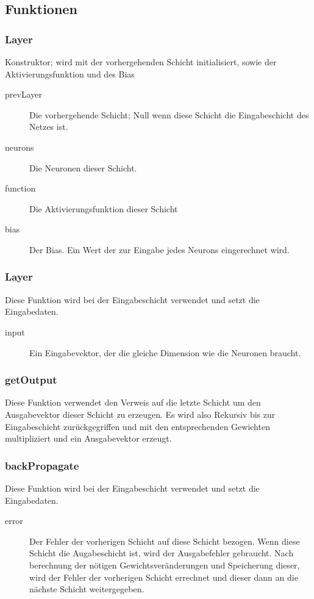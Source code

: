 \documentclass[a4paper,10pt]{scrartcl}
\begin{document}
\subsection{Funktionen}
\subsubsection{Layer}
Konstruktor; wird mit der vorhergehenden Schicht initialisiert, sowie der Aktivierungsfunktion und des Bias
\begin{description}
\item[prevLayer] Die vorhergehende Schicht; Null wenn diese Schicht die Eingabeschicht des Netzes ist.
\item[neurons] Die Neuronen dieser Schicht.
\item[function] Die Aktivierungsfunktion dieser Schicht
\item[bias]  Der Bias. Ein Wert der zur Eingabe jedes Neurons eingerechnet wird.
\end{description}


\subsubsection{Layer}
Diese Funktion wird bei der Eingabeschicht verwendet und setzt die Eingabedaten.
\begin{description}
\item[input] Ein Eingabevektor, der die gleiche Dimension wie die Neuronen braucht.
\end{description}

\subsubsection{getOutput}
Diese Funktion verwendet den Verweis auf die letzte Schicht um den Ausgabevektor dieser Schicht zu erzeugen. Es wird also Rekursiv bis zur
Eingabeschicht zurückgegriffen und mit den entsprechenden Gewichten multipliziert und ein Ausgabevektor erzeugt.

\subsubsection{backPropagate}
Diese Funktion wird bei der Eingabeschicht verwendet und setzt die Eingabedaten.
\begin{description}
\item[error]Der Fehler der vorherigen Schicht auf diese Schicht bezogen. Wenn diese Schicht die Augabeschicht ist, wird der Ausgabefehler
gebraucht. Nach berechnung der nötigen Gewichtsveränderungen und Speicherung dieser, wird der Fehler der vorherigen Schicht errechnet und
dieser dann an die nächste Schicht weitergegeben.
\end{description}
\end{document}

